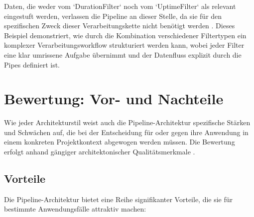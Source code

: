 \documentclass[11pt, a4paper]{article}
\begin{document}
Daten, die weder vom `DurationFilter` noch vom `UptimeFilter` als relevant eingestuft werden, verlassen die Pipeline an dieser Stelle, da sie für den spezifischen Zweck dieser Verarbeitungskette nicht benötigt werden \cite{RichardsFord2020}. Dieses Beispiel demonstriert, wie durch die Kombination verschiedener Filtertypen ein komplexer Verarbeitungsworkflow strukturiert werden kann, wobei jeder Filter eine klar umrissene Aufgabe übernimmt und der Datenfluss explizit durch die Pipes definiert ist.

\section{Bewertung: Vor- und Nachteile}

Wie jeder Architekturstil weist auch die Pipeline-Architektur spezifische Stärken und Schwächen auf, die bei der Entscheidung für oder gegen ihre Anwendung in einem konkreten Projektkontext abgewogen werden müssen. Die Bewertung erfolgt anhand gängiger architektonischer Qualitätsmerkmale \cite{RichardsFord2020}.

\subsection{Vorteile}

Die Pipeline-Architektur bietet eine Reihe signifikanter Vorteile, die sie für bestimmte Anwendungsfälle attraktiv machen:
\end{document}
